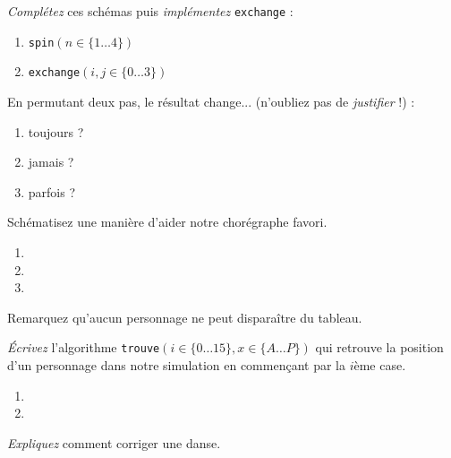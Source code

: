 \begin{exo}
\emph{Complétez} ces schémas puis \emph{implémentez} \texttt{exchange} :
\begin{multicols}{2}
	\begin{enumerate}[label=]
	\item \emptyboxes \texttt{spin$(n\in\{1\dots4\})$}
	\item \emptyboxes \texttt{exchange$(i, j\in\{0\dots3\})$}
	\end{enumerate}
\end{multicols}
\end{exo}

\begin{exo}
En permutant deux pas, le résultat change...
(n'oubliez pas de \emph{justifier} !) :
	\begin{enumerate}
		\item toujours ?
			\dotfill
		\item jamais ?
			\dotfill
		\item parfois ? 
			\dotfill
	\end{enumerate}
\end{exo}

\begin{exo}
Schématisez une manière d'aider notre chorégraphe favori.
\begin{enumerate}
\item {}
\item {}
\item {}
\end{enumerate}
\end{exo}

Remarquez qu'aucun personnage ne peut disparaître du tableau.
\begin{exo}
\emph{Écrivez} l'algorithme
\texttt{trouve}$(i\in\{0\dots15\}, x\in\{A\dots P\})$ qui retrouve la position
d'un personnage dans notre simulation en commençant par la $i$ème case.
\begin{enumerate}
\item {}
	\dotfill
\item {}
	\dotfill
\end{enumerate}
\end{exo}
\begin{exo}[Préparation]
	\emph{Expliquez} comment corriger une danse. 
\end{exo}

